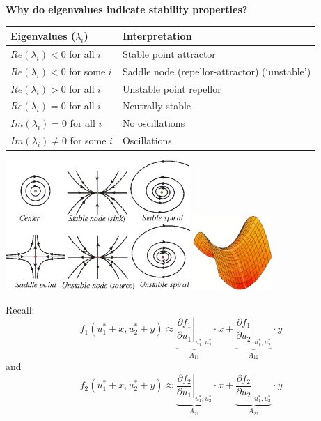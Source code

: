 \documentclass{article}
\begin{document}
\textbf{Why do eigenvalues indicate stability properties?}
\begin{center}
\begin{tabular}{ll}
\hline
\textbf{Eigenvalues ($\lambda_i$)} & \textbf{Interpretation} \\ 
\hline
 $Re(\lambda_i)< 0$  for all $i$& Stable point attractor \\ 
  $Re(\lambda_i)< 0$ for some $i$ & Saddle node (repellor-attractor) (`unstable') \\ 
 $Re(\lambda_i)> 0$ for all $i$ & Unstable point repellor  \\ 
 $Re(\lambda_i) = 0$ for all $i$ & Neutrally stable \\ 
 \hline
  $Im(\lambda_i) = 0$ for all $i$ & No oscillations \\ 
 $Im(\lambda_i) \neq 0$ for some $i$  & Oscillations \\ 
 \hline
\end{tabular} 
\end{center}
\begin{center}
	\includegraphics[width=7cm]{figs/Points.pdf}
	\includegraphics[width=3cm]{figs/Saddle.pdf}
\end{center}
Recall:
\begin{equation*}
	f_1(u_1^* + x, u_2^* + y)\approx \underbrace{\left. \frac{\partial f_1}{\partial u_1}\right|_{u_1^*, u_2^*}}_{A_{11}} \cdot x + \underbrace{\left. \frac{\partial f_1}{\partial u_2}\right|_{u_1^*, u_2^*}}_{A_{12}} \cdot y
\end{equation*}
and
\begin{equation*}
	f_2(u_1^* + x, u_2^* + y)\approx \underbrace{\left. \frac{\partial f_2}{\partial u_1}\right|_{u_1^*, u_2^*}}_{A_{21}} \cdot x + \underbrace{\left. \frac{\partial f_2}{\partial u_2}\right|_{u_1^*, u_2^*}}_{A_{22}} \cdot y
\end{equation*}
\end{document}
